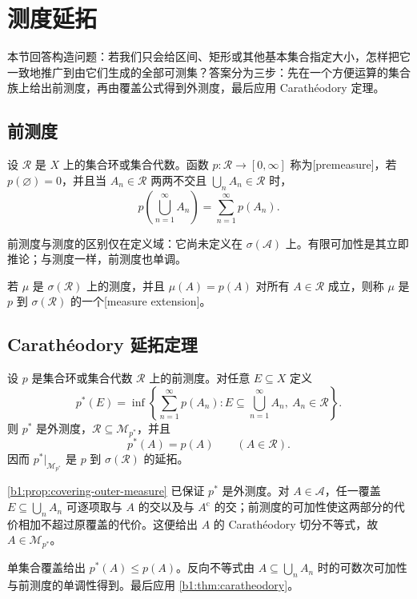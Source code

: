 \section{测度延拓}
\label{b1:sec:0204}

本节回答构造问题：若我们只会给区间、矩形或其他基本集合指定大小，怎样把它一致地推广到由它们生成的全部可测集？答案分为三步：先在一个方便运算的集合族上给出前测度，再由覆盖公式得到外测度，最后应用 Carathéodory 定理。

\subsection{前测度}
\label{b1:subsec:020401}

\begin{definition}
\label{b1:def:premeasure}
设 \(\mathcal R\) 是 \(X\) 上的集合环或集合代数。函数 \(p:\mathcal R\to[0,\infty]\) 称为[premeasure]，若 \(p(\varnothing)=0\)，并且当 \(A_n\in\mathcal R\) 两两不交且 \(\bigcup_nA_n\in\mathcal R\) 时，
\[
p\left(\bigcup_{n=1}^{\infty}A_n\right)
=\sum_{n=1}^{\infty}p(A_n).
\]
\end{definition}

前测度与测度的区别仅在定义域：它尚未定义在 \(\sigma(\mathcal A)\) 上。有限可加性是其立即推论；与测度一样，前测度也单调。

\begin{definition}
\label{b1:def:extension-measure}
若 \(\mu\) 是 \(\sigma(\mathcal R)\) 上的测度，并且 \(\mu(A)=p(A)\) 对所有 \(A\in\mathcal R\) 成立，则称 \(\mu\) 是 \(p\) 到 \(\sigma(\mathcal R)\) 的一个[measure extension]。
\end{definition}

\subsection{Carathéodory 延拓定理}
\label{b1:subsec:020402}

\begin{theorem}
\label{b1:thm:caratheodory-extension}
设 \(p\) 是集合环或集合代数 \(\mathcal R\) 上的前测度。对任意 \(E\subseteq X\) 定义
\[
p^*(E)
=\inf\left\{
\sum_{n=1}^{\infty}p(A_n):
E\subseteq\bigcup_{n=1}^{\infty}A_n,\ A_n\in\mathcal R
\right\}.
\]
则 \(p^*\) 是外测度，\(\mathcal R\subseteq\mathcal M_{p^*}\)，并且
\[
p^*(A)=p(A)\qquad(A\in\mathcal R).
\]
因而 \(p^*|_{\mathcal M_{p^*}}\) 是 \(p\) 到 \(\sigma(\mathcal R)\) 的延拓。
\end{theorem}
\begin{proofsketch}
\cref{b1:prop:covering-outer-measure} 已保证 \(p^*\) 是外测度。对 \(A\in\mathcal A\)，任一覆盖 \(E\subseteq\bigcup_nA_n\) 可逐项取与 \(A\) 的交以及与 \(A^{\mathrm c}\) 的交；前测度的可加性使这两部分的代价相加不超过原覆盖的代价。这便给出 \(A\) 的 Carathéodory 切分不等式，故 \(A\in\mathcal M_{p^*}\)。

单集合覆盖给出 \(p^*(A)\leq p(A)\)。反向不等式由 \(A\subseteq\bigcup_nA_n\) 时的可数次可加性与前测度的单调性得到。最后应用 \cref{b1:thm:caratheodory}。
\end{proofsketch}

